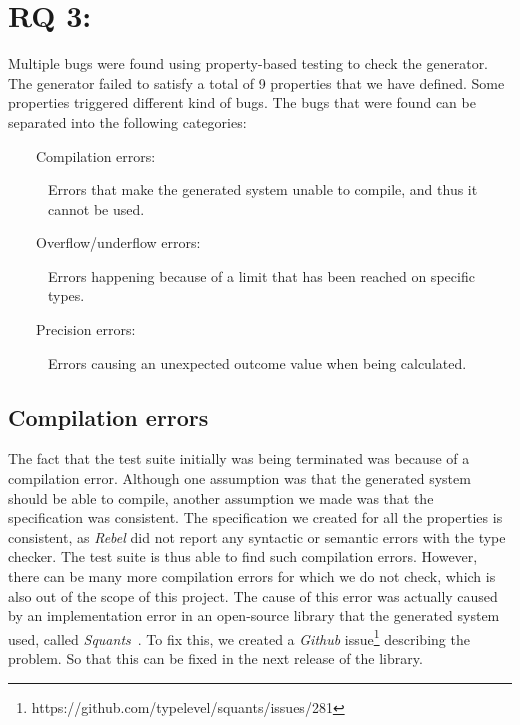 \section{RQ 3: \rqThree{}}
Multiple bugs were found using property-based testing to check the generator.
The generator failed to satisfy a total of 9 properties that we have defined.
Some properties triggered different kind of bugs. The bugs that were found can
be separated into the following categories:
\begin{description}
  \item[~~~~Compilation errors:] Errors that make the generated system unable to compile, and thus it cannot be used.
  \item[~~~~Overflow/underflow errors:] Errors happening because of a limit that has been reached on specific types.
  \item[~~~~Precision errors:] Errors causing an unexpected outcome value when being calculated.
\end{description}
\subsection*{Compilation errors}
The fact that the test suite initially was being terminated was because of a
compilation error. Although one assumption was that the generated system should
be able to compile, another assumption we made was that the specification was
consistent. The specification we created for all the properties is consistent,
as \textit{Rebel} did not report any syntactic or semantic errors with the type
checker. The test suite is thus able to find such compilation errors. However,
there can be many more compilation errors for which we do not check, which is
also out of the scope of this project. The cause of this error was actually
caused by an implementation error in an open-source library that the generated
system used, called \textit{Squants}~\cite{siteSquants2017}. To fix this, we
created a \textit{Github}
issue\footnote{https://github.com/typelevel/squants/issues/281} describing the
problem. So that this can be fixed in the next release of the library.

